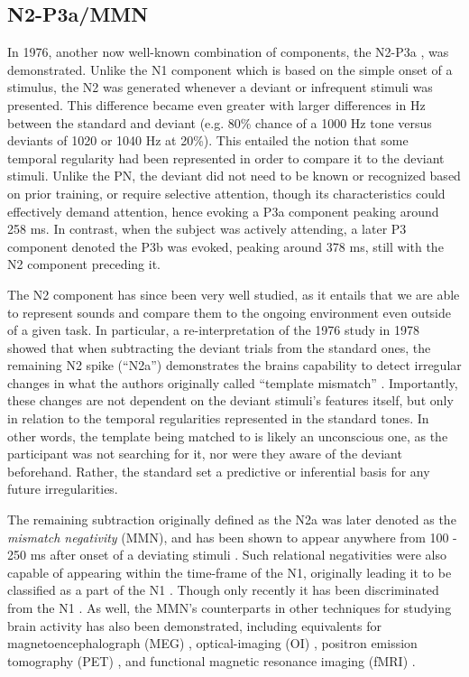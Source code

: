 \documentclass[a4paper,11pt,final]{ThesisStyle}
\begin{document}
\subsection{N2-P3a/MMN}

In 1976, another now well-known combination of components, the N2-P3a \cite{Snyder1976}, was demonstrated.  Unlike the N1 component which is based on the simple onset of a stimulus, the N2 was generated whenever a deviant or infrequent stimuli was presented.  This difference became even greater with larger differences in Hz between the standard and deviant (e.g. 80\% chance of a 1000 Hz tone versus deviants of 1020 or 1040 Hz at 20\%).  This entailed the notion that some temporal regularity had been represented in order to compare it to the deviant stimuli.  Unlike the PN, the deviant did not need to be known or recognized based on prior training, or require selective attention, though its characteristics could effectively demand attention, hence evoking a P3a component peaking around 258 ms.  In contrast, when the subject was actively attending, a later P3 component denoted the P3b was evoked, peaking around 378 ms, still with the N2 component preceding it. 

The N2 component has since been very well studied, as it entails that we are able to represent sounds and compare them to the ongoing environment even outside of a given task.  In particular, a re-interpretation of the 1976 study in 1978 showed that when subtracting the deviant trials from the standard ones, the remaining N2 spike (``N2a'') demonstrates the brains capability to detect irregular changes in what the authors originally called ``template mismatch'' \cite{Naatanen1978}.  Importantly, these changes are not dependent on the deviant stimuli's features itself, but only in relation to the temporal regularities represented in the standard tones.  In other words, the template being matched to is likely an unconscious one, as the participant was not searching for it, nor were they aware of the deviant beforehand.  Rather, the standard set a predictive or inferential basis for any future irregularities.  

The remaining subtraction originally defined as the N2a was later denoted as the \textit{mismatch negativity} (MMN), and has been shown to appear anywhere from 100 - 250 ms after onset of a deviating stimuli \cite{Naatanen1978,Naatanen1987,Naatanen2007,Campbell2007,Garrido2009,Naatanen2011}.  Such relational negativities were also capable of appearing within the time-frame of the N1, originally leading it to be classified as a part of the N1 \cite{Naatanen1987}.  Though only recently it has been discriminated from the N1 \cite{Campbell2007}.  As well, the MMN's counterparts in other techniques for studying brain activity has also been demonstrated, including equivalents for magnetoencephalograph (MEG) \cite{Hari1984}, optical-imaging (OI) \cite{Rinne1999}, positron emission tomography (PET) \cite{Tervaniemi2000}, and functional magnetic resonance imaging (fMRI) \cite{Celsis1999}.  
\end{document}
